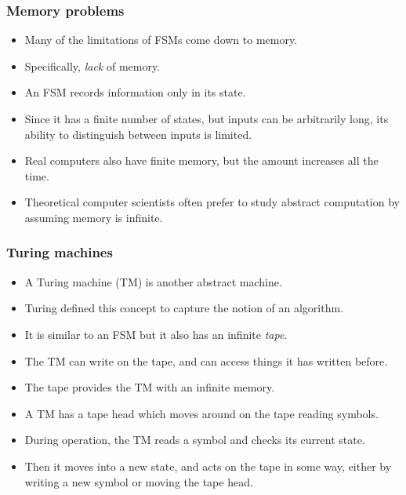 \documentclass[handout]{beamer}
\begin{document}
\begin{frame}
\frametitle{Memory problems}
\begin{itemize}
\item Many of the limitations of FSMs come down to memory.
\vspace{0.2cm}
\item Specifically, \emph{lack} of memory.
\vspace{0.2cm}
\item An FSM records information only in its state.
\vspace{0.2cm}
\item Since it has a finite number of states, but inputs can be arbitrarily long, its ability to distinguish between inputs is limited.
\vspace{0.2cm}
\item Real computers also have finite memory, but the amount increases all the time.
\vspace{0.2cm}
\item Theoretical computer scientists often prefer to study abstract computation by assuming memory is infinite.
\end{itemize}
\end{frame}

\begin{frame}
\frametitle{Turing machines}
\begin{itemize}
\item A Turing machine (TM) is another abstract machine.
\item Turing defined this concept to capture the notion of an algorithm.
\item It is similar to an FSM but it also has an infinite \emph{tape}.
\item The TM can write on the tape, and can access things it has written before.
\item The tape provides the TM with an infinite memory.
\item A TM has a tape head which moves around on the tape reading symbols.
\item During operation, the TM reads a symbol and checks its current state.
\item Then it moves into a new state, and acts on the tape in some way, either by writing a new symbol or moving the tape head. 
\end{itemize}
\end{frame}
\end{document}
